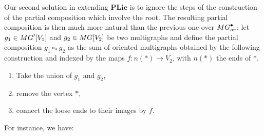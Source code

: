 \documentclass[11pt]{article}
\theoremstyle{definition}
\numberwithin{equation}{section}
\newcommand{\spe}[1]{\normalfont{\textsc{#1}}}
\newcommand{\op}[1]{\mathbf{#1}}
\newcommand{\point}[1]{#1^{\bullet}}
\newcommand{\comp}[1][\ast]{\circ_{#1}}
\newcommand{\MG}{\spe{MG}}
\newcommand{\PLie}{\op{PLie}}
\begin{document}
Our second solution in extending $\PLie$ is to ignore the steps of the construction of the partial 
composition which involve the root. The resulting partial composition is then much more natural than the 
previous one over $\point{\MG}_{or}$: let $g_1\in\MG'[V_1]$ and $g_2\in\MG[V_2]$ be two multigraphs and 
define the partial composition $g_1\comp g_2$ as the sum of oriented multigraphs obtained by the 
following construction and indexed by the maps $f:n(\ast)\to V_2$, with $n(\ast)$ the ends of $\ast$.
\begin{enumerate}
    \item Take the union of $g_1$ and $g_2$,

    \item remove the vertex $\ast$,

    \item connect the loose ends to their images by $f$.
\end{enumerate}
For instance, we have:
\end{document}
